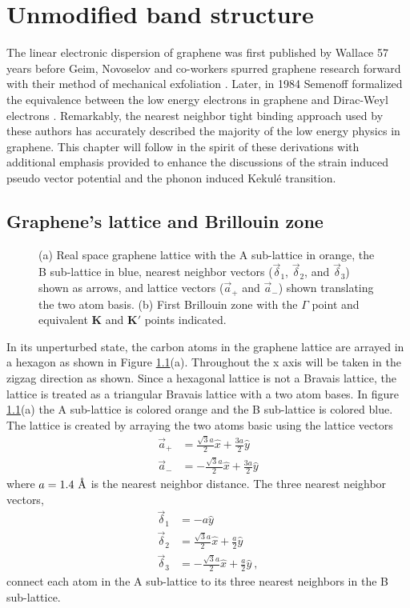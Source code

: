 \chapter{Unmodified band structure\label{chap:TB}}

The linear electronic dispersion of graphene was first published by Wallace \cite{Wallace1947} 57 years before Geim, Novoselov and co-workers spurred graphene research forward with their method of mechanical exfoliation \cite{Novoselov2004}.
Later, in 1984 Semenoff formalized the equivalence between the low energy electrons in graphene and Dirac-Weyl electrons \cite{Semenoff1984}.
Remarkably, the nearest neighbor tight binding approach used by these authors has accurately described the majority of the low energy physics in graphene.
This chapter will follow in the spirit of these derivations with additional emphasis provided to enhance the discussions of the strain induced pseudo vector potential and the phonon induced Kekul\'e transition.

\section{Graphene's lattice and Brillouin zone}
\begin{figure}
	\begin{center}
	
	\end{center}
	\caption{\label{fig:TB:geometry} (a) Real space graphene lattice with the A sub-lattice in orange, the B sub-lattice in blue, nearest neighbor vectors ($\vec \delta_1$, $\vec \delta_2$, and $\vec \delta_3$) shown as arrows, and lattice vectors ($\vec a_+$ and $\vec a_-$) shown translating the two atom basis. (b) First Brillouin zone with the $\Gamma$ point and equivalent $\bm{K}$ and $\bm{K'}$ points indicated.}
\end{figure}

In its unperturbed state, the carbon atoms in the graphene lattice are arrayed in a hexagon as shown in Figure \ref{fig:TB:geometry}(a).
Throughout the x axis will be taken in the zigzag direction as shown.
Since a hexagonal lattice is not a Bravais lattice, the lattice is treated as a triangular Bravais lattice with a two atom bases.
In figure \ref{fig:TB:geometry}(a) the A sub-lattice is colored orange and the B sub-lattice is colored blue.
The lattice is created by arraying the two atoms basic using the lattice vectors 
\begin{align*}
	\vec{a}_+&= \frac{\sqrt{3}a}{2} \hat{x} + \frac{3a}{2} \hat{y} \\
	\vec{a}_-&=-\frac{\sqrt{3}a}{2} \hat{x} + \frac{3a}{2} \hat{y}
\end{align*}
where $a=1.4 \ \textup{\AA}$ is the nearest neighbor distance.
The three nearest neighbor vectors,
\begin{align*}
	\vec \delta_1&=-a \hat{y} \\
	\vec \delta_2&= \frac{\sqrt{3} a}{2}\hat{x}+\frac{a}{2}\hat{y}\\
	\vec \delta_3&=-\frac{\sqrt{3} a}{2}\hat{x}+\frac{a}{2}\hat{y} \ ,
\end{align*}
connect each atom in the A sub-lattice to its three nearest neighbors in the B sub-lattice.

